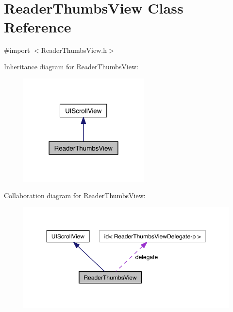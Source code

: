 \hypertarget{interface_reader_thumbs_view}{\section{Reader\-Thumbs\-View Class Reference}
\label{dd/df8/interface_reader_thumbs_view}
}


{\ttfamily \#import $<$Reader\-Thumbs\-View.\-h$>$}



Inheritance diagram for Reader\-Thumbs\-View\-:
\nopagebreak
\begin{figure}[H]
\begin{center}
\leavevmode
\includegraphics[width=186pt]{de/d96/interface_reader_thumbs_view__inherit__graph}
\end{center}
\end{figure}


Collaboration diagram for Reader\-Thumbs\-View\-:
\nopagebreak
\begin{figure}[H]
\begin{center}
\leavevmode
\includegraphics[width=350pt]{df/d7a/interface_reader_thumbs_view__coll__graph}
\end{center}
\end{figure}
